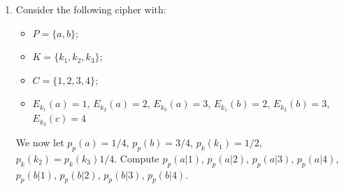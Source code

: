 \begin{enumerate}
    \item Consider the following cipher with:

    \begin{itemize}
        \item $P = \{a,b\}$;
        \item $K = \{k_1, k_2, k_3\}$;
        \item $C = \{1,2,3,4\}$;
        \item $E_{k_1}(a) = 1$, $E_{k_2}(a) = 2$, $E_{k_3}(a) = 3$, $E_{k_1}(b) = 2$, $E_{k_2}(b) = 3$, $E_{k_3}(c) = 4$
    \end{itemize}

    We now let $p_p(a) = 1/4$, $p_p(b) = 3/4$, $p_{k}(k_1) = 1/2$, $p_{k}(k_2) = p_k(k_3) 1/4$. Compute $p_p(a|1)$, $p_p(a|2)$, $p_p(a|3)$, $p_p(a|4)$, $p_p(b|1)$, $p_p(b|2)$, $p_p(b|3)$, $p_p(b|4)$.
    
\end{enumerate}